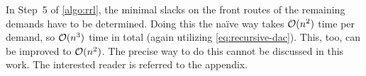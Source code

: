 In Step~5 of \cref{algo:rrl}, the minimal slacks on the front routes of the remaining demands have to be determined.
Doing this the naïve way takes $\mathcal{O}(n^2)$ time per demand, so $\mathcal{O}(n^3)$ time in total (again utilizing \cref{eq:recursive-dac}).
This, too, can be improved to $\mathcal{O}(n^2)$.
The precise way to do this cannot be discussed in this work. 
The interested reader is referred to the appendix.
